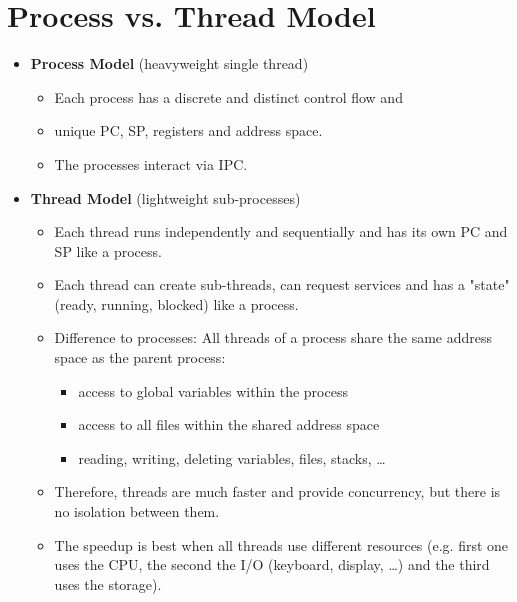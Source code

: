 \documentclass[a4paper, 11pt, accentcolor = tud3b]{tudreport}
\begin{document}
	    \section{Process vs. Thread Model}
		    \begin{itemize}
		    	\item \textbf{Process Model} (heavyweight single thread)
			    	\begin{itemize}
			    		\item Each process has a discrete and distinct control flow and
			    		\item unique PC, SP, registers and address space.
			    		\item The processes interact via IPC.
			    	\end{itemize}
		    	\item \textbf{Thread Model} (lightweight sub-processes)
			    	\begin{itemize}
			    		\item Each thread runs independently and sequentially and has its own PC and SP like a process.
			    		\item Each thread can create sub-threads, can request services and has a "state" (ready, running, blocked) like a process.
			    		\item Difference to processes: All threads of a process share the same address space as the parent process:
				    		\begin{itemize}
				    			\item access to global variables within the process
				    			\item access to all files within the shared address space
				    			\item reading, writing, deleting variables, files, stacks, \dots
				    		\end{itemize}
			    		\item Therefore, threads are much faster and provide concurrency, but there is no isolation between them.
			    		\item The speedup is best when all threads use different resources (e.g. first one uses the CPU, the second the I/O (keyboard, display, \dots) and the third uses the storage).
			    	\end{itemize}
		    \end{itemize}
\end{document}
